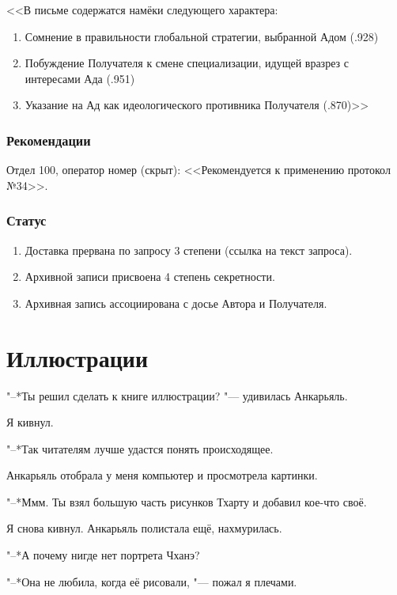 \documentclass[a4paper,10pt,fleqn]{book}
\begin{document}
<<В письме содержатся намёки следующего характера:

\begin{enumerate}
\item Сомнение в правильности глобальной стратегии, выбранной Адом (.928)
\item Побуждение Получателя к смене специализации, идущей вразрез с интересами Ада (.951)
\item Указание на Ад как идеологического противника Получателя (.870)>>
\end{enumerate}

\subsubsection{Рекомендации}

Отдел 100, оператор номер (скрыт): <<Рекомендуется к применению протокол №34>>.

\subsubsection{Статус}

\begin{enumerate}
\item Доставка прервана по запросу 3 степени (ссылка на текст запроса).
\item Архивной записи присвоена 4 степень секретности.
\item Архивная запись ассоциирована с досье Автора и Получателя.
\end{enumerate}

\section{Иллюстрации}

"--*Ты решил сделать к книге иллюстрации? "--- удивилась Анкарьяль.

Я кивнул.

"--*Так читателям лучше удастся понять происходящее.

Анкарьяль отобрала у меня компьютер и просмотрела картинки.

"--*Ммм.
Ты взял большую часть рисунков Тхарту и добавил кое-что своё.

Я снова кивнул.
Анкарьяль полистала ещё, нахмурилась.

"--*А почему нигде нет портрета Чханэ?

"--*Она не любила, когда её рисовали, "--- пожал я плечами.
\end{document}
